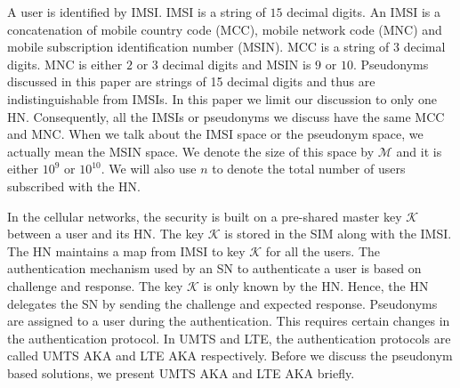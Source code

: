 \documentclass{llncs} %
\begin{document}
A user is identified by IMSI. IMSI is a string of $15$ decimal digits. An IMSI is a concatenation of mobile country code (MCC), mobile network code (MNC) and mobile subscription identification number (MSIN). MCC is a string of $3$ decimal digits. MNC is either $2$ or $3$ decimal digits and MSIN is $9$ or $10$. Pseudonyms discussed in this paper are strings of 15 decimal digits and thus are indistinguishable from IMSIs. In this paper we limit our discussion to only one HN. Consequently, all the IMSIs or pseudonyms we discuss have the same MCC and MNC. When we talk about the IMSI space or the pseudonym space, we actually mean the MSIN space. We denote the size of this space by $\mathcal{M}$ and it is either $10^9$ or $10^{10}$. We will also use $n$ to denote the total number of users subscribed with the HN.

In the cellular networks, the security is built on a pre-shared master key $\mathcal{K}$ between a user and its HN. The key $\mathcal{K}$ is stored in the SIM along with the IMSI. The HN maintains a map from IMSI to key $\mathcal{K}$ for all the users. The authentication mechanism used by an SN to authenticate a user is based on challenge and response. The key $\mathcal{K}$ is only known by the HN. Hence, the HN delegates the SN by sending the challenge and expected response. %
Pseudonyms are assigned to a user during the authentication. This requires certain changes in the authentication protocol. In UMTS and LTE, the authentication protocols are called UMTS AKA and LTE AKA respectively. Before we discuss the pseudonym based solutions, we present UMTS AKA  and LTE AKA briefly.


\end{document}
